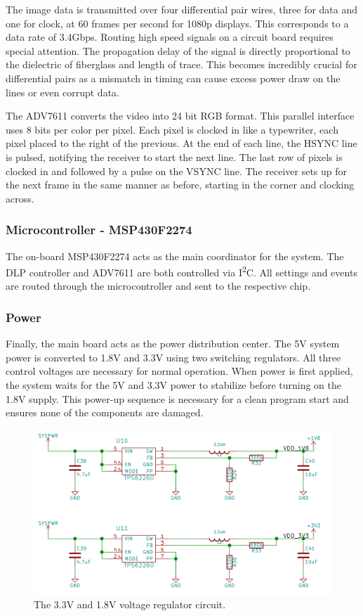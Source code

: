 \documentclass[12pt,a4paper]{article}
\begin{document}
The image data is transmitted over four differential pair wires, three for data and one for clock, at 60 frames per second for 1080p displays. This corresponds to a data rate of 3.4Gbps. Routing high speed signals on a circuit board requires special attention. The propagation delay of the signal is directly proportional to the dielectric of fiberglass and length of trace. This becomes incredibly crucial for differential pairs as a mismatch in timing can cause excess power draw on the lines or even corrupt data. 

The ADV7611 converts the video into 24 bit RGB format. This parallel interface uses 8 bits per color per pixel. Each pixel is clocked in like a typewriter, each pixel placed to the right of the previous. At the end of each line, the HSYNC line is pulsed, notifying the receiver to start the next line. The last row of pixels is clocked in and followed by a pulse on the VSYNC line. The receiver sets up for the next frame in the same manner as before, starting in the corner and clocking across.



\subsubsection{Microcontroller - MSP430F2274}
The on-board MSP430F2274 acts as the main coordinator for the system. The DLP controller and ADV7611 are both controlled via I\textsuperscript{2}C. All settings and events are routed through the microcontroller and sent to the respective chip. 

\subsubsection{Power}
Finally, the main board acts as the power distribution center. The 5V system power is converted to 1.8V and 3.3V using two switching regulators. All three control voltages are necessary for normal operation. When power is first applied, the system waits for the 5V and 3.3V power to stabilize before turning on the 1.8V supply. This power-up sequence is necessary for a clean program start and ensures none of the components are damaged. 
\begin{figure}[h!]
	\centering
	\includegraphics[width = \textwidth]{pics/powerReg.png}
	\caption[Power Regulator Schematic]{\centering The 3.3V and 1.8V voltage regulator circuit.}
\end{figure}
\end{document}
